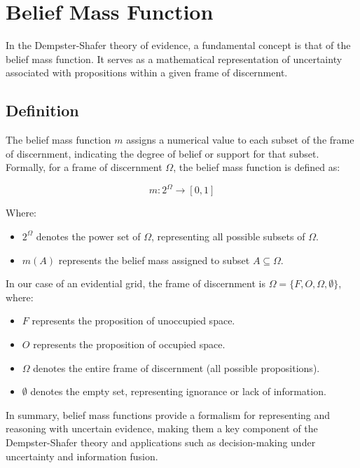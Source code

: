 
\section{Belief Mass Function}

In the Dempster-Shafer theory of evidence, a fundamental concept is that of the belief mass function.
It serves as a mathematical representation of uncertainty associated with propositions within a given frame of discernment.

\subsection{Definition}

The belief mass function $ m $ assigns a numerical value to each subset of the frame of discernment, indicating the degree of belief or support for that subset. Formally, for a frame of discernment $ \Omega $, the belief mass function is defined as:

$$ m: 2^\Omega \rightarrow [0,1] $$

Where:

\begin{itemize}
    \item $ 2^\Omega $ denotes the power set of $ \Omega $, representing all possible subsets of $ \Omega $.
    \item $ m(A) $ represents the belief mass assigned to subset $ A \subseteq \Omega $.
\end{itemize}

In our case of an evidential grid, the frame of discernment is $\Omega = \{F, O, \Omega, \emptyset\}$, where:

\begin{itemize}
    \item $ F $ represents the proposition of unoccupied space.
    \item $ O $ represents the proposition of occupied space.
    \item $ \Omega $ denotes the entire frame of discernment (all possible propositions).
    \item $ \emptyset $ denotes the empty set, representing ignorance or lack of information.
\end{itemize}

In summary, belief mass functions provide a formalism for representing and reasoning with uncertain evidence, making them a key component of the Dempster-Shafer theory and applications such as decision-making under uncertainty and information fusion.


